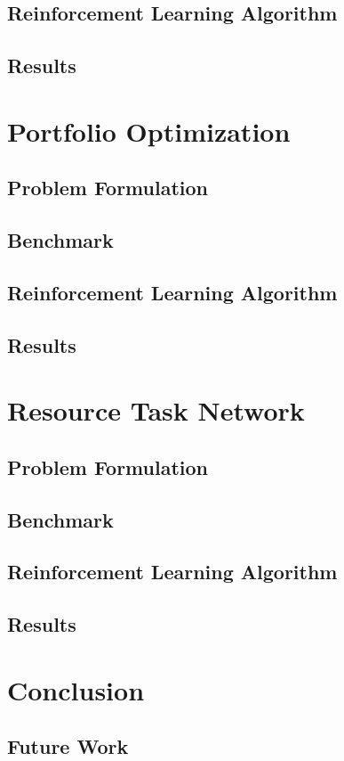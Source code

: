 \documentclass[12pt]{article}
\begin{document}
\subsection{Reinforcement Learning Algorithm}

\subsection{Results}

\section{Portfolio Optimization}

\subsection{Problem Formulation}

\subsection{Benchmark}

\subsection{Reinforcement Learning Algorithm}

\subsection{Results}

\section{Resource Task Network}

\subsection{Problem Formulation}

\subsection{Benchmark}

\subsection{Reinforcement Learning Algorithm}

\subsection{Results}

\section{Conclusion}

\subsection{Future Work}

\newpage


\end{document}
